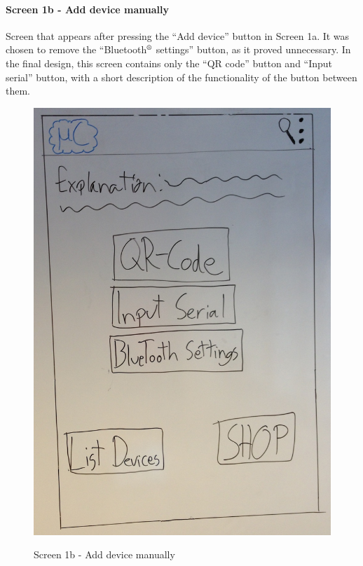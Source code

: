 \paragraph{Screen 1b - Add device manually}
Screen that appears after pressing the ``Add device'' button in Screen 1a. It was chosen to remove the ``Bluetooth$\textsuperscript{\textregistered}$ settings'' button, as it proved unnecessary. In the final design, this screen contains only the ``QR code'' button and ``Input serial'' button, with a short description of the functionality of the button between them.

\begin{figure}[H]
\centering
\includegraphics[scale=0.2]{images/Design_guide/Screen1b.png}
\label{fig:1b}
\caption{Screen 1b - Add device manually}
\end{figure}



